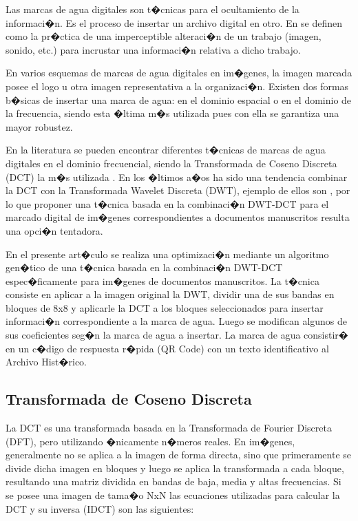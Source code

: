 \documentclass{rcci} %
\begin{document}
Las marcas de agua digitales son t�cnicas para el ocultamiento de la informaci�n. Es el proceso de insertar un archivo digital en otro. En \parencite{Cox2008} se definen como
la pr�ctica de una imperceptible alteraci�n de un trabajo (imagen, sonido, etc.) para incrustar una informaci�n relativa a dicho trabajo.

En varios esquemas de marcas de agua digitales en im�genes, la imagen marcada posee el logo u otra imagen representativa a la organizaci�n.
Existen dos formas b�sicas de insertar una marca de agua: en el dominio espacial o en el dominio de la frecuencia, siendo esta �ltima m�s utilizada pues con ella se garantiza
una mayor robustez.

En la literatura se pueden encontrar diferentes t�cnicas de marcas de agua digitales en el dominio frecuencial,
siendo la Transformada de Coseno Discreta (DCT) la m�s utilizada \parencite{Singh2017, Abraham2016, Nikam2016, Rahman2016, Kang2013}.
En los �ltimos a�os ha sido una tendencia combinar la DCT con la Transformada Wavelet Discreta (DWT), ejemplo de ellos son
\parencite{Cao2010, Chow2017, Ghazvini2017, PriyankaRani2016, Salama2016, Journal2015},
 por lo que proponer una t�cnica basada en la combinaci�n DWT-DCT para el marcado digital de im�genes correspondientes a documentos manuscritos resulta una opci�n tentadora.

En el presente art�culo se realiza una optimizaci�n mediante un algoritmo gen�tico de una t�cnica basada en la
combinaci�n DWT-DCT espec�ficamente para im�genes de documentos manuscritos. La t�cnica consiste en aplicar a
la imagen original la DWT, dividir una de sus bandas en bloques de 8x8 y aplicarle la DCT a los bloques
seleccionados para insertar informaci�n correspondiente a la marca de agua. Luego se modifican algunos de sus
coeficientes seg�n la marca de agua a insertar. La marca de agua consistir� en un c�digo de respuesta r�pida
(QR Code) con un texto identificativo al Archivo Hist�rico.

\subsection{Transformada de Coseno Discreta}

La DCT es una transformada basada en la Transformada de Fourier Discreta (DFT),
pero utilizando �nicamente n�meros reales. En im�genes, generalmente no se aplica a la imagen de forma directa, sino que primeramente
se divide dicha imagen en bloques y luego se aplica la transformada a cada bloque, resultando una matriz dividida en bandas de baja, media
y altas frecuencias. Si se posee una imagen de tama�o NxN las ecuaciones utilizadas para calcular la DCT y su inversa (IDCT) son las siguientes:
\end{document}
